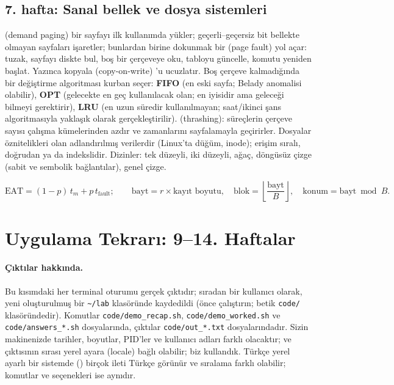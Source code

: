 \subsection{7. hafta: Sanal bellek ve dosya sistemleri}
 (demand paging) bir sayfayı ilk kullanımda yükler; geçerli--geçersiz bit bellekte olmayan sayfaları işaretler; bunlardan birine dokunmak bir  (page fault) yol açar: tuzak, sayfayı diskte bul, boş bir çerçeveye oku, tabloyu güncelle, komutu yeniden başlat. Yazınca kopyala (copy-on-write) 'u ucuzlatır. Boş çerçeve kalmadığında bir değiştirme algoritması kurban seçer: \textbf{FIFO} (en eski sayfa; Belady anomalisi olabilir), \textbf{OPT} (gelecekte en geç kullanılacak olan; en iyisidir ama geleceği bilmeyi gerektirir), \textbf{LRU} (en uzun süredir kullanılmayan; saat/ikinci şans algoritmasıyla yaklaşık olarak gerçekleştirilir).  (thrashing): süreçlerin çerçeve sayısı çalışma kümelerinden azdır ve zamanlarını sayfalamayla geçirirler. Dosyalar öznitelikleri olan adlandırılmış verilerdir (Linux'ta düğüm, inode); erişim sıralı, doğrudan ya da indekslidir. Dizinler: tek düzeyli, iki düzeyli, ağaç, döngüsüz çizge (sabit ve sembolik bağlantılar), genel çizge.
\begin{example}
\[
\text{EAT} = (1-p)\,t_m + p\,t_{\text{fault}}; \qquad
\text{bayt} = r \times \text{kayıt boyutu},\quad \text{blok} = \left\lfloor \frac{\text{bayt}}{B} \right\rfloor,\quad \text{konum} = \text{bayt} \bmod B.
\]
\end{example}

\section{Uygulama Tekrarı: 9--14. Haftalar}
\label{sec:practical}

{\sloppy \paragraph{Çıktılar hakkında.} Bu kısımdaki her terminal oturumu gerçek çıktıdır; sıradan bir kullanıcı olarak, yeni oluşturulmuş bir \texttt{\textasciitilde/lab} klasöründe kaydedildi (önce  çalıştırın; betik \texttt{code/} klasöründedir). Komutlar \texttt{code/demo\_recap.sh}, \texttt{code/demo\_worked.sh} ve \texttt{code/answers\_*.sh} dosyalarında, çıktılar \texttt{code/out\_*.txt} dosyalarındadır. Sizin makinenizde tarihler, boyutlar, PID'ler ve kullanıcı adları farklı olacaktır;  ve  çıktısının sırası yerel ayara (locale) bağlı olabilir; biz  kullandık. Türkçe yerel ayarlı bir sistemde () birçok ileti Türkçe görünür ve sıralama farklı olabilir; komutlar ve seçenekleri ise aynıdır.\par}

